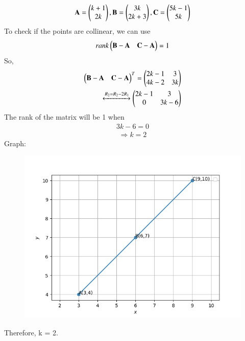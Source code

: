 \documentclass[journal,12pt,onecolumn]{IEEEtran}
\begin{document}
		\begin{align}
			\vec{A} = \myvec{k+1\\2k},\vec{B} = \myvec{3k\\2k+3},\vec{C} = \myvec{5k-1\\5k} 
		\end{align}
		To check if the points are collinear, we can use 
		\begin{align}
			rank\myvec{\vec{B}-\vec{A} & \vec{C}-\vec{A}} = 1	
		\end{align}
		So,
		\begin{align}
			\myvec{\vec{B}-\vec{A} & \vec{C}-\vec{A}}^T = \myvec{2k-1 & 3 \\ 4k-2 & 3k}	
			\\
			\xleftrightarrow[]{R_2 = R_2 - 2R_1} 
			\myvec{2k-1 & 3 \\ 0 & 3k-6} 
		\end{align}
		The rank of the matrix will be 1 when 
		\begin{align}
		3k-6 = 0
		\end{align}
		\begin{align}
		\Rightarrow k = 2
		\end{align}
		Graph:
\begin{figure}[H]
	\centering
	\includegraphics[scale=0.5]{img}
	\caption*{}
	\label{img}
\end{figure}


		Therefore, k = 2.
\end{document}
